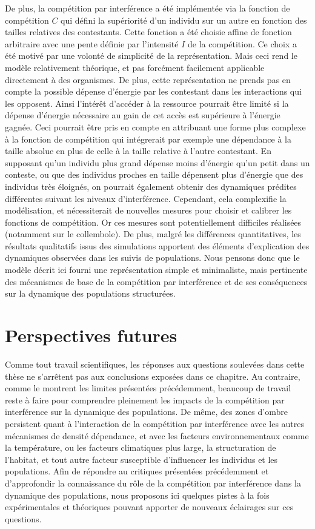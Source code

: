 De plus, la compétition par interférence a été implémentée via la fonction de
compétition $C$ qui défini la supériorité d'un individu sur un autre en fonction
des tailles relatives des contestants. Cette fonction a été choisie affine de
fonction arbitraire avec une pente définie par l'intensité $I$ de la
compétition. Ce choix a été motivé par une volonté de simplicité de la
représentation. Mais ceci rend le modèle relativement théorique, et pas
forcément facilement applicable directement à des organismes. De plus, cette
représentation ne prends pas en compte la possible dépense d'énergie par les
contestant dans les interactions qui les opposent. Ainsi l'intérêt d'accéder à
la ressource pourrait être limité si la dépense d'énergie nécessaire au gain de
cet accès est supérieure à l'énergie gagnée. Ceci pourrait être pris en compte
en attribuant une forme plus complexe à la fonction de compétition qui
intégrerait par exemple une dépendance à la taille absolue en plus de celle à la
taille relative à l'autre contestant. En supposant qu'un individu plus grand
dépense moins d'énergie qu'un petit dans un conteste, ou que des individus
proches en taille dépensent plus d'énergie que des individus très éloignés, on
pourrait également obtenir des dynamiques prédites différentes suivant les
niveaux d'interférence. Cependant, cela complexifie la
modélisation, et nécessiterait de nouvelles mesures pour choisir et calibrer les
fonctions de compétition. Or ces mesures sont potentiellement difficiles
réalisées (notamment sur le collembole). De plus, malgré les différences
quantitatives, les résultats qualitatifs issus des simulations apportent des
éléments d'explication des dynamiques observées dans les suivis de populations.
Nous pensons donc que le modèle décrit ici fourni une représentation simple et
minimaliste, mais pertinente des mécanismes de base de la compétition par
interférence et de ses conséquences sur la dynamique des populations
structurées. 

\section{Perspectives futures}

Comme tout travail scientifiques, les réponses aux questions soulevées dans
cette thèse ne s'arrêtent pas aux conclusions exposées dans ce chapitre. Au
contraire, comme le montrent les limites présentées précédemment, beaucoup de
travail reste à faire pour comprendre pleinement les impacts de la compétition
par interférence sur la dynamique des populations. De même, des zones d'ombre
persistent quant à l'interaction de la compétition par interférence avec les
autres mécanismes de densité dépendance, et avec les facteurs environnementaux
comme la température, ou les facteurs climatiques plus large, la structuration
de l'habitat, et tout autre facteur susceptible d'influencer les individus et
les populations. Afin de répondre au critiques présentées précédemment et
d'approfondir la connaissance du rôle de la compétition par interférence dans la
dynamique des populations, nous proposons ici quelques pistes à la fois
expérimentales et théoriques pouvant apporter de nouveaux éclairages sur ces
questions.

